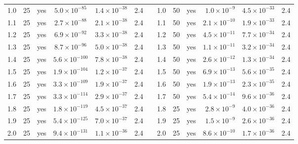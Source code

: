 \documentclass[11pt,letterpaper,fleqn]{article}
\begin{document}
\begin{table}[p]
\begin{adjustbox}{max width=\textwidth}
\begin{tabular}{@{}rrrcrrr|rrcrrr@{}}
1.0 & 25 & yes & $5.0\times10^{-85}$ & $1.4\times10^{-38}$ & 2.4 & & 1.0 & 50 & yes & $1.0\times10^{-9}$ & $4.5\times10^{-33}$ & 2.4\\
1.1 & 25 & yes & $2.7\times10^{-88}$ & $2.1\times10^{-38}$ & 2.4 & & 1.1 & 50 & yes & $2.1\times10^{-10}$ & $1.9\times10^{-33}$ & 2.4\\
1.2 & 25 & yes & $6.9\times10^{-92}$ & $3.3\times10^{-38}$ & 2.4 & & 1.2 & 50 & yes & $4.5\times10^{-11}$ & $7.7\times10^{-34}$ & 2.4\\
1.3 & 25 & yes & $8.7\times10^{-96}$ & $5.0\times10^{-38}$ & 2.4 & & 1.3 & 50 & yes & $1.1\times10^{-11}$ & $3.2\times10^{-34}$ & 2.4\\
1.4 & 25 & yes & $5.6\times10^{-100}$ & $7.8\times10^{-38}$ & 2.4 & & 1.4 & 50 & yes & $2.6\times10^{-12}$ & $1.3\times10^{-34}$ & 2.4\\
1.5 & 25 & yes & $1.9\times10^{-104}$ & $1.2\times10^{-37}$ & 2.4 & & 1.5 & 50 & yes & $6.9\times10^{-13}$ & $5.6\times10^{-35}$ & 2.4\\
1.6 & 25 & yes & $3.3\times10^{-109}$ & $1.9\times10^{-37}$ & 2.4 & & 1.6 & 50 & yes & $1.9\times10^{-13}$ & $2.3\times10^{-35}$ & 2.4\\
1.7 & 25 & yes & $3.3\times10^{-114}$ & $2.9\times10^{-37}$ & 2.4 & & 1.7 & 50 & yes & $5.4\times10^{-14}$ & $9.6\times10^{-36}$ & 2.4\\
1.8 & 25 & yes & $1.8\times10^{-119}$ & $4.5\times10^{-37}$ & 2.4 & & 1.8 & 25 & yes & $2.8\times10^{-9}$ & $4.0\times10^{-36}$ & 2.4\\
1.9 & 25 & yes & $5.4\times10^{-125}$ & $7.0\times10^{-37}$ & 2.4 & & 1.9 & 25 & yes & $1.5\times10^{-9}$ & $2.6\times10^{-36}$ & 2.4\\
2.0 & 25 & yes & $9.4\times10^{-131}$ & $1.1\times10^{-36}$ & 2.4 & & 2.0 & 25 & yes & $8.6\times10^{-10}$ & $1.7\times10^{-36}$ & 2.4\\
\bottomrule\end{tabular}\end{adjustbox}\end{table}
\end{document}
